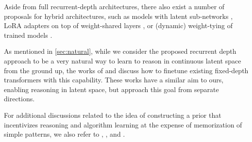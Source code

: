 Aside from full recurrent-depth architectures, there also exist a number of proposals for hybrid architectures, such as models with latent sub-networks \citep{li_deep_2020}, LoRA adapters on top of weight-shared layers \citep{bae_relaxed_2024}, or (dynamic) weight-tying of trained models \citep{hay_dynamic_2023,liu_mobilellm_2024}. 

As mentioned in \cref{sec:natural}, while we consider the proposed recurrent depth approach to be a very natural way to learn to reason in continuous latent space from the ground up, the works of \citet{hao_training_2024,cheng_compressed_2024} and \citet{liu_deliberation_2024} discuss how to finetune existing fixed-depth transformers with this capability. These works have a similar aim to ours, enabling reasoning in latent space, but approach this goal from separate directions.

For additional discussions related to the idea of constructing a prior that incentivizes reasoning and algorithm learning at the expense of memorization of simple patterns, we also refer to \citet{chollet_measure_2019}, \citet{schwarzschild_deep_2023}, \citet{li_strong_2020} and \citet{moulton_many_2023}.